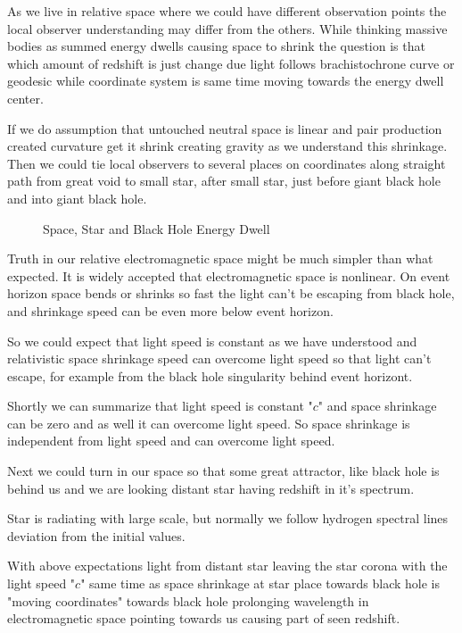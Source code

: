 As we live in relative space where we could have different observation points
the local observer understanding may differ from the others. While thinking
massive bodies as summed energy dwells causing space to shrink the question
is that which amount of redshift is just change due light follows
brachistochrone curve or geodesic while coordinate system is same
time moving towards the energy dwell center.

If we do assumption that untouched neutral space is linear and pair
production created curvature get it shrink creating gravity as we understand
this shrinkage. Then we could tie local observers to several places on
coordinates along straight path from great void to small star, after small
star, just before giant black hole and into giant black hole.

\begin{figure}
 \begin{center}
  \caption{Space, Star and Black Hole Energy Dwell}
  \label{fig:StarBlackHole}
 \end{center}
\end{figure}

Truth in our relative electromagnetic space might be much simpler than what
expected. It is widely accepted that electromagnetic space is nonlinear. On
event horizon space bends or shrinks so fast the light can't be escaping from
black hole, and shrinkage speed can be even more below event horizon.

So we could expect that light speed is constant as we have understood and
relativistic space shrinkage speed can overcome light speed so that light
can't escape, for example from the black hole singularity behind event
horizont.

Shortly we can summarize that light speed is constant "$c$" and space
shrinkage can be zero and as well it can overcome light speed. So space
shrinkage is independent from light speed and can overcome light speed.

Next we could turn in our space so that some great attractor, like black
hole is behind us and we are looking distant star having redshift in it's
spectrum.

Star is radiating with large scale, but normally we follow hydrogen spectral
lines deviation from the initial values.

With above expectations light from distant star leaving the star corona with
the light speed "$c$" same time as space shrinkage at star place towards
black hole is "moving coordinates" towards black hole prolonging wavelength
in electromagnetic space pointing towards us causing part of seen redshift.

